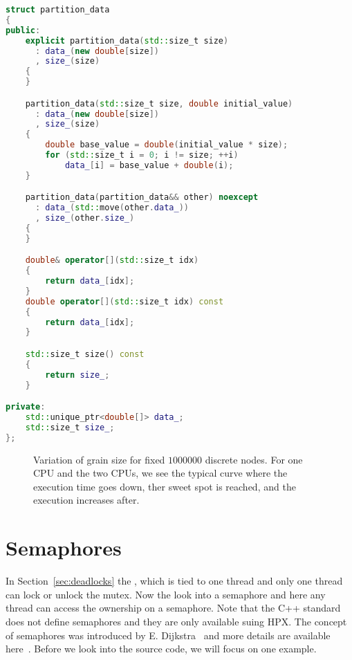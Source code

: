 \begin{lstlisting}[language=c++,caption={Adding the grain size control the futurized one-dimensional heat equation.\label{code:hpx:future:grain}},float,floatplacement=tbp]
struct partition_data
{
public:
    explicit partition_data(std::size_t size)
      : data_(new double[size])
      , size_(size)
    {
    }

    partition_data(std::size_t size, double initial_value)
      : data_(new double[size])
      , size_(size)
    {
        double base_value = double(initial_value * size);
        for (std::size_t i = 0; i != size; ++i)
            data_[i] = base_value + double(i);
    }

    partition_data(partition_data&& other) noexcept
      : data_(std::move(other.data_))
      , size_(other.size_)
    {
    }

    double& operator[](std::size_t idx)
    {
        return data_[idx];
    }
    double operator[](std::size_t idx) const
    {
        return data_[idx];
    }

    std::size_t size() const
    {
        return size_;
    }

private:
    std::unique_ptr<double[]> data_;
    std::size_t size_;
};

\end{lstlisting}

\begin{figure}[tbp]
\centering
{}
\caption{Variation of grain size for fixed $1000000$ discrete nodes. For one CPU and the two CPUs, we see the typical curve where the execution time goes down, ther sweet spot is reached, and the execution increases after. }
\label{fig:scaling:future:grain:size}
\end{figure}
\section{Semaphores}
\label{sec:hpx:semaphores}
In Section~\ref{sec:deadlocks} the , which is tied to one thread and only one thread can lock or unlock the mutex. Now the look into a semaphore and here any thread can access the ownership on a semaphore. Note that the C++ standard does not define semaphores and they are only available suing HPX. The concept of semaphores was introduced by E. Dijkstra~\cite{dijkstra1962over} and more details are available here~\cite{downey2008little}. Before we look into the source code, we will focus on one example. \\

